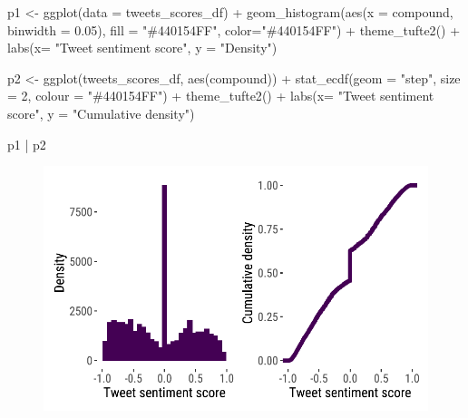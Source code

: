 \documentclass[
  letterpaper,
  DIV=11,
  numbers=noendperiod]{scrreprt}
\newenvironment{Shaded}{\begin{snugshade}}{\end{snugshade}}
\newcommand{\AttributeTok}[1]{\textcolor[rgb]{0.40,0.45,0.13}{#1}}
\newcommand{\DecValTok}[1]{\textcolor[rgb]{0.68,0.00,0.00}{#1}}
\newcommand{\FloatTok}[1]{\textcolor[rgb]{0.68,0.00,0.00}{#1}}
\newcommand{\FunctionTok}[1]{\textcolor[rgb]{0.28,0.35,0.67}{#1}}
\newcommand{\NormalTok}[1]{\textcolor[rgb]{0.00,0.23,0.31}{#1}}
\newcommand{\OtherTok}[1]{\textcolor[rgb]{0.00,0.23,0.31}{#1}}
\newcommand{\SpecialCharTok}[1]{\textcolor[rgb]{0.37,0.37,0.37}{#1}}
\newcommand{\StringTok}[1]{\textcolor[rgb]{0.13,0.47,0.30}{#1}}
\begin{document}
\begin{Shaded}
\begin{Highlighting}[]
\NormalTok{p1 }\OtherTok{\textless{}{-}} \FunctionTok{ggplot}\NormalTok{(}\AttributeTok{data =}\NormalTok{ tweets\_scores\_df) }\SpecialCharTok{+}
  \FunctionTok{geom\_histogram}\NormalTok{(}\FunctionTok{aes}\NormalTok{(}\AttributeTok{x =}\NormalTok{ compound, }
                 \AttributeTok{binwidth =} \FloatTok{0.05}\NormalTok{), }
                 \AttributeTok{fill =} \StringTok{"\#440154FF"}\NormalTok{,}
                 \AttributeTok{color=}\StringTok{"\#440154FF"}\NormalTok{) }\SpecialCharTok{+}
  \FunctionTok{theme\_tufte2}\NormalTok{() }\SpecialCharTok{+} 
  \FunctionTok{labs}\NormalTok{(}\AttributeTok{x=} \StringTok{"Tweet sentiment score"}\NormalTok{,}
       \AttributeTok{y =} \StringTok{"Density"}\NormalTok{)}

\NormalTok{p2 }\OtherTok{\textless{}{-}} \FunctionTok{ggplot}\NormalTok{(tweets\_scores\_df, }\FunctionTok{aes}\NormalTok{(compound)) }\SpecialCharTok{+} 
  \FunctionTok{stat\_ecdf}\NormalTok{(}\AttributeTok{geom =} \StringTok{"step"}\NormalTok{,}
            \AttributeTok{size =} \DecValTok{2}\NormalTok{,}
            \AttributeTok{colour =} \StringTok{"\#440154FF"}\NormalTok{) }\SpecialCharTok{+}
  \FunctionTok{theme\_tufte2}\NormalTok{() }\SpecialCharTok{+} 
  \FunctionTok{labs}\NormalTok{(}\AttributeTok{x=} \StringTok{"Tweet sentiment score"}\NormalTok{,}
       \AttributeTok{y =} \StringTok{"Cumulative density"}\NormalTok{)}

\NormalTok{p1 }\SpecialCharTok{|}\NormalTok{ p2}
\end{Highlighting}
\end{Shaded}

\begin{figure}[H]

{\centering \includegraphics{sentiment-analysis_files/figure-pdf/unnamed-chunk-32-1.pdf}

}

\end{figure}
\end{document}
